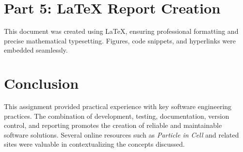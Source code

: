 \documentclass[
]{IEEEtran}
\begin{document}
\section{Part 5: LaTeX Report Creation}
This document was created using \LaTeX, ensuring professional formatting and precise mathematical typesetting. Figures, code snippets, and hyperlinks were embedded seamlessly.

\section{Conclusion}
This assignment provided practical experience with key software engineering practices. The combination of development, testing, documentation, version control, and reporting promotes the creation of reliable and maintainable software solutions. Several online resources such as \textit{Particle in Cell} and related sites \cite{particleincell, iamlubos, slovakcooking} were valuable in contextualizing the concepts discussed.



\end{document}
